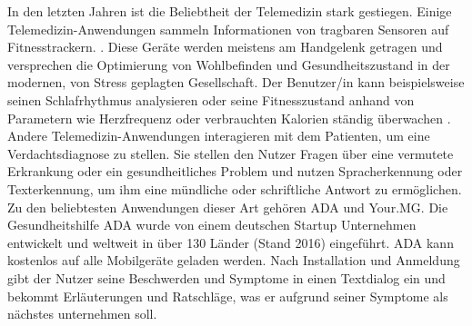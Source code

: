In den letzten Jahren ist die Beliebtheit der Telemedizin stark gestiegen. Einige Telemedizin-Anwendungen sammeln Informationen von tragbaren Sensoren auf Fitnesstrackern. \cite{Opportunities_challenges_ai_hc}. Diese Geräte werden meistens am Handgelenk getragen und versprechen die Optimierung von Wohlbefinden und Gesundheitszustand in der modernen, von Stress geplagten Gesellschaft. Der Benutzer/in kann beispielsweise seinen Schlafrhythmus analysieren oder seine Fitnesszustand anhand von Parametern wie Herzfrequenz oder verbrauchten Kalorien ständig überwachen \cite{Opportunities_challenges_ai_hc}. \\

Andere Telemedizin-Anwendungen interagieren mit dem Patienten, um eine Verdachtsdiagnose zu stellen.\cite{Opportunities_challenges_ai_hc} Sie stellen den Nutzer Fragen über eine vermutete Erkrankung oder ein gesundheitliches Problem und nutzen Spracherkennung oder Texterkennung, um ihm eine mündliche oder schriftliche Antwort zu ermöglichen.
Zu den beliebtesten Anwendungen dieser Art gehören ADA und Your.MG. Die Gesundheitshilfe ADA wurde von einem deutschen Startup Unternehmen entwickelt und weltweit in über 130 Länder (Stand 2016) eingeführt.\cite{Opportunities_challenges_ai_hc} ADA kann kostenlos auf alle Mobilgeräte geladen werden. Nach Installation und Anmeldung gibt der Nutzer seine Beschwerden und Symptome in einen Textdialog ein und bekommt Erläuterungen und Ratschläge, was er aufgrund seiner Symptome als nächstes unternehmen soll.\\
 
